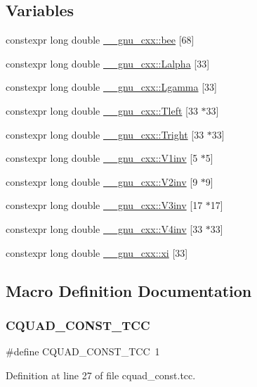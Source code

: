 \subsection*{Variables}
\begin{DoxyCompactItemize}
\item 
constexpr long double \hyperlink{namespace____gnu__cxx_aad4f17907300687377704d1e628e1d70}{\+\_\+\+\_\+gnu\+\_\+cxx\+::bee} \mbox{[}68\mbox{]}
\item 
constexpr long double \hyperlink{namespace____gnu__cxx_a6a28a325aceb8d1e4e70d68b1cdeb156}{\+\_\+\+\_\+gnu\+\_\+cxx\+::\+Lalpha} \mbox{[}33\mbox{]}
\item 
constexpr long double \hyperlink{namespace____gnu__cxx_a8148a5d125951ff217becb9212005bea}{\+\_\+\+\_\+gnu\+\_\+cxx\+::\+Lgamma} \mbox{[}33\mbox{]}
\item 
constexpr long double \hyperlink{namespace____gnu__cxx_a7e499d0005aca8d0d6dd4eb30c0bc008}{\+\_\+\+\_\+gnu\+\_\+cxx\+::\+Tleft} \mbox{[}33 $\ast$33\mbox{]}
\item 
constexpr long double \hyperlink{namespace____gnu__cxx_aa35b50708b727cd96920850c90482637}{\+\_\+\+\_\+gnu\+\_\+cxx\+::\+Tright} \mbox{[}33 $\ast$33\mbox{]}
\item 
constexpr long double \hyperlink{namespace____gnu__cxx_abac562ad4a226ad8799434617959af3d}{\+\_\+\+\_\+gnu\+\_\+cxx\+::\+V1inv} \mbox{[}5 $\ast$5\mbox{]}
\item 
constexpr long double \hyperlink{namespace____gnu__cxx_aa4b649154290c645f634d501d63fac0f}{\+\_\+\+\_\+gnu\+\_\+cxx\+::\+V2inv} \mbox{[}9 $\ast$9\mbox{]}
\item 
constexpr long double \hyperlink{namespace____gnu__cxx_ac23b44065db55792c4f65364f34ee956}{\+\_\+\+\_\+gnu\+\_\+cxx\+::\+V3inv} \mbox{[}17 $\ast$17\mbox{]}
\item 
constexpr long double \hyperlink{namespace____gnu__cxx_a19b55e8c50f41d9d0a5618653f960f5c}{\+\_\+\+\_\+gnu\+\_\+cxx\+::\+V4inv} \mbox{[}33 $\ast$33\mbox{]}
\item 
constexpr long double \hyperlink{namespace____gnu__cxx_a8a912ee89c90a7e5049ce5ffad04274b}{\+\_\+\+\_\+gnu\+\_\+cxx\+::xi} \mbox{[}33\mbox{]}
\end{DoxyCompactItemize}


\subsection{Macro Definition Documentation}
\mbox{\label{cquad__const_8tcc_add45880010d7c8e58bc44b322ebb55c7}} 
\subsubsection{\texorpdfstring{C\+Q\+U\+A\+D\+\_\+\+C\+O\+N\+S\+T\+\_\+\+T\+CC}{CQUAD\_CONST\_TCC}}
{\footnotesize\ttfamily \#define C\+Q\+U\+A\+D\+\_\+\+C\+O\+N\+S\+T\+\_\+\+T\+CC~1}



Definition at line 27 of file cquad\+\_\+const.\+tcc.

